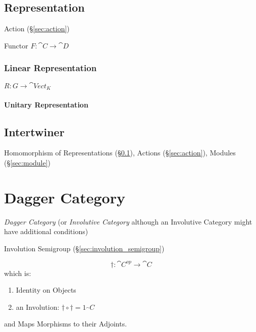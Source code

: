 \subsection{Representation}\label{sec:representation}

Action (\S\ref{sec:action})

Functor $F : \cat{C} \rightarrow \cat{D}$



\subsubsection{Linear Representation}\label{sec:linear_representation}

$R : G \rightarrow \cat{Vect}_K$



\paragraph{Unitary Representation}\label{sec:unitary_representation}



\subsection{Intertwiner}\label{sec:intertwiner}

Homomorphism of Representations (\S\ref{sec:representation}), Actions
(\S\ref{sec:action}), Modules (\S\ref{sec:module})



\section{Dagger Category}\label{sec:dagger_category}

\emph{Dagger Category} (or \emph{Involutive Category} although an
Involutive Category might have additional conditions) %

Involution Semigroup (\S\ref{sec:involution_semigroup})

\[
  \dag : \cat{C}^{op} \rightarrow \cat{C}
\]
which is:
\begin{enumerate}
  \item Identity on Objects
  \item an Involution: $\dag \circ \dag = 1_\cat{C}$
\end{enumerate}
and Maps Morphisms to their Adjoints. %

